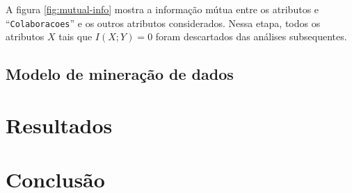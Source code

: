 \documentclass[12pt]{article}
\begin{document}
A figura \ref{fig:mutual-info} mostra a informação mútua entre os atributos e ``\texttt{Colaboracoes}'' e os outros atributos considerados.
Nessa etapa, todos os atributos $X$ tais que $I(X; Y) = 0$ foram descartados das análises subsequentes.

\subsection{Modelo de mineração de dados}
\label{sec:datamine}

\section{Resultados}
\label{sec:results}

\section{Conclusão}
\label{sec:conclusion}



\end{document}
